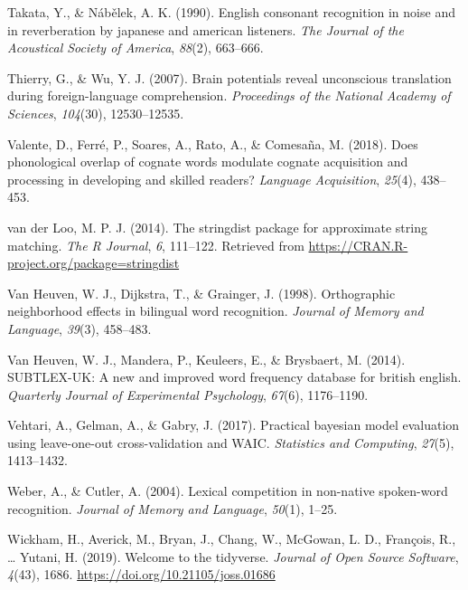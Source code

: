 \documentclass[
  english,
  man,floatsintext]{apa6}
\newlength{\cslhangindent}
\newenvironment{CSLReferences}[2] %
 {%
  \setlength{\parindent}{0pt}
  \ifodd #1 \everypar{\setlength{\hangindent}{\cslhangindent}}\ignorespaces\fi
  \ifnum #2 > 0
  \setlength{\parskip}{#2\baselineskip}
  \fi
 }%
 {}
\begin{document}
\begin{CSLReferences}{1}{0}
\leavevmode{}%
Takata, Y., \& Nábělek, A. K. (1990). English consonant recognition in noise and in reverberation by japanese and american listeners. \emph{The Journal of the Acoustical Society of America}, \emph{88}(2), 663--666.

\leavevmode{}%
Thierry, G., \& Wu, Y. J. (2007). Brain potentials reveal unconscious translation during foreign-language comprehension. \emph{Proceedings of the National Academy of Sciences}, \emph{104}(30), 12530--12535.

\leavevmode{}%
Valente, D., Ferré, P., Soares, A., Rato, A., \& Comesaña, M. (2018). Does phonological overlap of cognate words modulate cognate acquisition and processing in developing and skilled readers? \emph{Language Acquisition}, \emph{25}(4), 438--453.

\leavevmode{}%
van der Loo, M. P. J. (2014). The stringdist package for approximate string matching. \emph{The {R} {J}ournal}, \emph{6}, 111--122. Retrieved from \url{https://CRAN.R-project.org/package=stringdist}

\leavevmode{}%
Van Heuven, W. J., Dijkstra, T., \& Grainger, J. (1998). Orthographic neighborhood effects in bilingual word recognition. \emph{Journal of Memory and Language}, \emph{39}(3), 458--483.

\leavevmode{}%
Van Heuven, W. J., Mandera, P., Keuleers, E., \& Brysbaert, M. (2014). SUBTLEX-UK: A new and improved word frequency database for british english. \emph{Quarterly Journal of Experimental Psychology}, \emph{67}(6), 1176--1190.

\leavevmode{}%
Vehtari, A., Gelman, A., \& Gabry, J. (2017). Practical bayesian model evaluation using leave-one-out cross-validation and WAIC. \emph{Statistics and Computing}, \emph{27}(5), 1413--1432.

\leavevmode{}%
Weber, A., \& Cutler, A. (2004). Lexical competition in non-native spoken-word recognition. \emph{Journal of Memory and Language}, \emph{50}(1), 1--25.

\leavevmode{}%
Wickham, H., Averick, M., Bryan, J., Chang, W., McGowan, L. D., François, R., \ldots{} Yutani, H. (2019). Welcome to the {tidyverse}. \emph{Journal of Open Source Software}, \emph{4}(43), 1686. \url{https://doi.org/10.21105/joss.01686}

\end{CSLReferences}

\endgroup

\newpage
\end{document}
